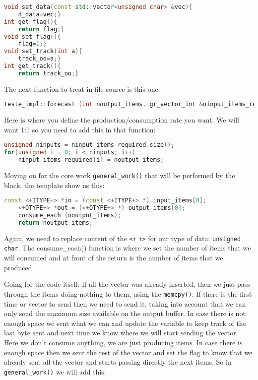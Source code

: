 \documentclass[a4paper, 10pt, conference]{ieeeconf}      %
\begin{document}
 \begin{lstlisting}[language=c++, breaklines]   
void set_data(const std::vector<unsigned char> &vec){
    d_data=vec;}
int get_flag(){
    return flag;}
void set_flag(){
    flag=1;}
void set_track(int a){
    track_oo=a;}
int get_track(){
    return track_oo;}
\end{lstlisting}    

    The next function to treat in file source is this one:
\begin{lstlisting}[language=c++, breaklines]   
teste_impl::forecast (int noutput_items, gr_vector_int &ninput_items_required){}
\end{lstlisting}
    
    Here is where you define the production/consumption rate you want. We will want 1:1 so you need to add this in that function:
    
\begin{lstlisting}[language=c++, breaklines]    
unsigned ninputs = ninput_items_required.size();
for(unsigned i = 0; i < ninputs; i++)
    ninput_items_required[i] = noutput_items;
\end{lstlisting}
    
    Moving on for the core work \verb|general_work()| that will be performed by the block, the template show us this:

\begin{lstlisting}[language=c++, breaklines]    
    const <+ITYPE+> *in = (const <+ITYPE+> *) input_items[0];
    <+OTYPE+> *out = (<+OTYPE+> *) output_items[0];
    consume_each (noutput_items);
    return noutput_items;

\end{lstlisting}

    Again, we need to replace content of the \verb|<+| \verb|+>| for our type of data: \verb|unsigned char|. The consume\_each() function is where we set the number of items that we will consumed and at front of the return is the number of items that we produced.
    
    Going for the code itself:
    If all the vector was already inserted, then we just pass through the items doing nothing to them, using the \verb|memcpy()|.
    If there is the first time or vector to send then we need to send it, taking into account that we can only send the maximum size available on the output buffer. In case there is not enough space we sent what we can and update the variable to keep track of the last byte sent and next time we know where we will start sending the vector. Here we don't consume anything, we are just producing items. In case there is enough space then we sent the rest of the vector and set the flag to know that we already sent all the vector and starts passing directly the next items.
    So in \verb|general_work()| we will add this:
\end{document}

